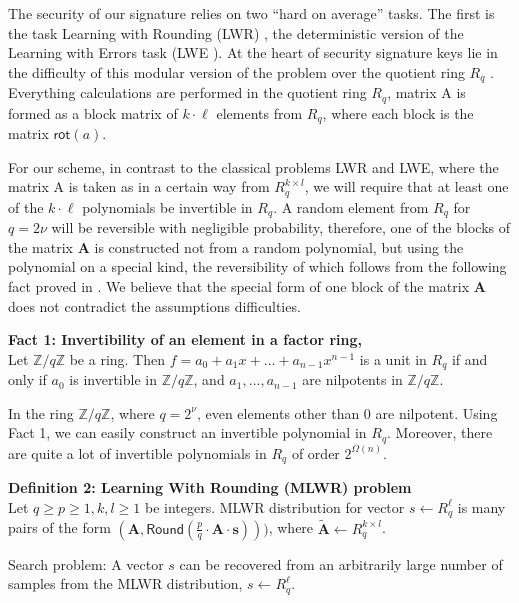 \documentclass{article}
\theoremstyle{plain}
\theoremstyle{definition}
\begin{document}
    The security of our signature relies on two “hard on average” tasks. The first is the task Learning with Rounding (LWR) \cite{BPR12}, the deterministic version of the Learning with Errors task (LWE \cite{Reg05}). At the heart of security signature keys lie in the difficulty of this modular version of the problem over the quotient ring $R_q$ \cite{LS15}. Everything calculations are performed in the quotient ring $R_q$, matrix A is formed as a block matrix of $k \cdot \ell$ elements from $R_q$, where each block is the matrix $\mathsf{rot}(a)$.
    
    For our scheme, in contrast to the classical problems LWR and LWE, where the matrix A is taken as in a certain way from $R^{k \times l}_q$, we will require that at least one of the $k \cdot \ell$ polynomials be invertible in $R_q$. A random element from $R_q$ for $q = 2\nu$ will be reversible with negligible probability, therefore, one of the blocks of the matrix $\mathbf{A}$ is constructed not from a random polynomial, but using the polynomial on a special kind, the reversibility of which follows from the following fact proved in \cite{Wat07}.  We believe that the special form of one block of the matrix $\mathbf{A}$ does not contradict the assumptions difficulties.
    \newline

    \textbf{Fact 1: Invertibility of an element in a factor ring,\cite[Theorem 11.1]{Wat07}}\\ Let $\mathbb{Z}/q\mathbb{Z}$ be a ring. Then $f = a_0 + a_1x + \dots + a_{n-1}x^{n-1}$ is a unit in $R_q$ if and only if $a_0$ is invertible in $\mathbb{Z}/q\mathbb{Z}$, and $a_1, \dots, a_{n-1}$ are nilpotents in $\mathbb{Z}/q\mathbb{Z}$.
    
    In the ring $\mathbb{Z}/q\mathbb{Z}$, where $q = 2^\nu$, even elements other than $0$ are nilpotent. Using Fact 1, we can easily construct an invertible polynomial in $R_q$. Moreover, there are quite a lot of invertible polynomials in $R_q$ of order $2^{\Omega(n)}$.
    \newline

    \textbf{Definition 2: Learning With Rounding (MLWR) problem}\\
    Let $q \geq p \geq 1, k, l \geq 1$ be integers. MLWR distribution for vector $s \leftarrow R^\ell_q$ is many pairs of the form $(\mathbf{A}, \mathsf{Round}(\frac{p}{q}\cdot\mathbf{A}\cdot\mathbf{s})))$, where $\mathbf{\tilde{A}} \leftarrow R^{k \times l}_q$.
    
    Search problem: A vector $s$ can be recovered from an arbitrarily large number of samples from the MLWR distribution, $s \leftarrow R^\ell_q$.
\end{document}
